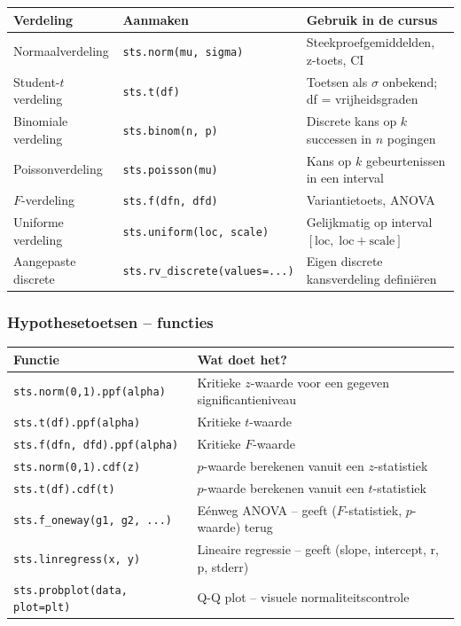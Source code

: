 \documentclass[a4paper,11pt]{article}
\begin{document}
\begin{center}
\renewcommand{\arraystretch}{1.3}
\begin{tabularx}{\linewidth}{@{}llX@{}}
\toprule
\textbf{Verdeling} & \textbf{Aanmaken} & \textbf{Gebruik in de cursus} \\
\midrule
Normaalverdeling & \texttt{sts.norm(mu, sigma)} & Steekproefgemiddelden, z-toets, CI \\
Student-$t$ verdeling & \texttt{sts.t(df)} & Toetsen als $\sigma$ onbekend; df = vrijheidsgraden \\
Binomiale verdeling & \texttt{sts.binom(n, p)} & Discrete kans op $k$ successen in $n$ pogingen \\
Poissonverdeling & \texttt{sts.poisson(mu)} & Kans op $k$ gebeurtenissen in een interval \\
$F$-verdeling & \texttt{sts.f(dfn, dfd)} & Variantietoets, ANOVA \\
Uniforme verdeling & \texttt{sts.uniform(loc, scale)} & Gelijkmatig op interval $[\text{loc},\;\text{loc}+\text{scale}]$ \\
Aangepaste discrete & \texttt{sts.rv\_discrete(values=...)} & Eigen discrete kansverdeling definiëren \\
\bottomrule
\end{tabularx}
\end{center}

\subsubsection*{Hypothesetoetsen -- functies}

\begin{center}
\renewcommand{\arraystretch}{1.3}
\begin{tabularx}{\linewidth}{@{}lX@{}}
\toprule
\textbf{Functie} & \textbf{Wat doet het?} \\
\midrule
\texttt{sts.norm(0,1).ppf(alpha)} & Kritieke $z$-waarde voor een gegeven significantieniveau \\
\texttt{sts.t(df).ppf(alpha)} & Kritieke $t$-waarde \\
\texttt{sts.f(dfn, dfd).ppf(alpha)} & Kritieke $F$-waarde \\
\texttt{sts.norm(0,1).cdf(z)} & $p$-waarde berekenen vanuit een $z$-statistiek \\
\texttt{sts.t(df).cdf(t)} & $p$-waarde berekenen vanuit een $t$-statistiek \\
\texttt{sts.f\_oneway(g1, g2, ...)} & Eénweg ANOVA -- geeft ($F$-statistiek, $p$-waarde) terug \\
\texttt{sts.linregress(x, y)} & Lineaire regressie -- geeft (slope, intercept, r, p, stderr) \\
\texttt{sts.probplot(data, plot=plt)} & Q-Q plot -- visuele normaliteitscontrole \\
\bottomrule
\end{tabularx}
\end{center}
\end{document}
